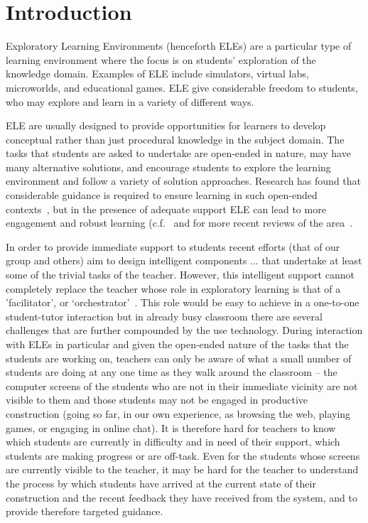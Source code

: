 \section{Introduction}
\label{sec:introduction}

Exploratory Learning Environments (henceforth ELEs) are a particular
type of learning environment where the focus is on students'
exploration of the knowledge domain. Examples of ELE
include simulators, virtual labs, microworlds, and educational
games. ELE give considerable freedom to students, who may explore and
learn in a variety of different ways.

ELE are usually designed to provide opportunities for learners to
develop conceptual rather than just procedural knowledge in the subject
domain. The tasks that students are asked to
undertake are open-ended in nature, may have many alternative
solutions, and encourage students to explore the learning
environment and follow a variety of solution approaches. Research
has found that considerable guidance is required to ensure learning in
such open-ended contexts~\cite{kirschner06,Kynigos92,MayerDiscovery},
but in the presence of adequate support ELE can lead to more engagement
and robust learning (c.f.~\cite{Noss96,JongJoolingen98} and for more
recent reviews of the area~\cite{InquiryLearningJoolingen,Healy2010Charting}. 

In order to provide immediate support to students recent efforts  
(that of our group and others) aim to design intelligent components ... 
that undertake at least some of the trivial tasks of the teacher. 
However, this intelligent support cannot completely replace the teacher 
whose role in exploratory learning is that 
of a 'facilitator’, or
`orchestrator'~\cite{Trouche2004,Hoyles2004Integration}. This role
would be easy to achieve in a one-to-one student-tutor interaction but in already
 busy classroom there are several challenges that are further compounded by the 
use technology. During interaction with ELEs in particular and given the
open-ended nature of the tasks that the students are working on,
 teachers can only be aware of what a small number of
students are doing at any one time as they walk around the classroom –
the computer screens of the students who are not in their immediate
vicinity are not visible to them and those students may not be engaged
in productive construction (going so far, in our own experience, as
browsing the web, playing games, or engaging in online chat). It is
therefore hard for teachers to know which students are currently in
difficulty and in need of their support, which students are making
progress or are off-task. Even for the
students whose screens are currently visible to the teacher, it may be
hard for the teacher to understand the process by which students have
arrived at the current state of their construction and the recent
feedback they have received from the system, and to provide therefore
targeted guidance. 

